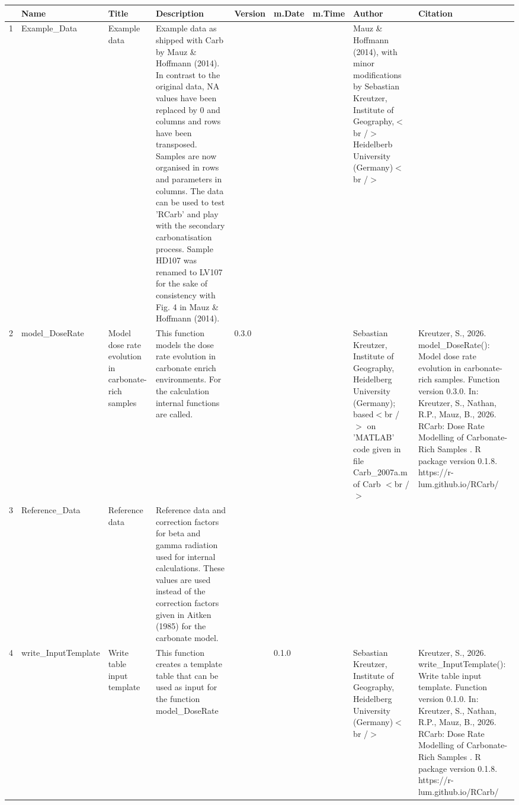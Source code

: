 \begin{table}[ht]
\centering
\begin{tabular}{rllllllll}
  \hline
 & Name & Title & Description & Version & m.Date & m.Time & Author & Citation \\ 
  \hline
1 & Example\_Data & Example data & Example data as shipped with  Carb  by Mauz \& Hoffmann (2014). In contrast to the original data,  NA  values have been replaced by 0 and columns and rows have been transposed. Samples are now organised in rows and parameters in columns.  The data can be used to test  'RCarb'  and play with the secondary carbonatisation process. Sample HD107 was renamed to LV107 for the sake of consistency with Fig. 4 in Mauz \& Hoffmann (2014). &  &  &  & Mauz \& Hoffmann (2014), with minor modifications by Sebastian Kreutzer, Institute of Geography,$<$br /$>$ Heidelberb University (Germany)$<$br /$>$ &  \\ 
  2 & model\_DoseRate & Model dose rate evolution in carbonate-rich samples & This function models the dose rate evolution in carbonate enrich environments. For the calculation internal functions are called. & 0.3.0
 &  &  & Sebastian Kreutzer, Institute of Geography, Heidelberg University (Germany); based$<$br /$>$ on 'MATLAB' code given in file Carb\_2007a.m of  Carb $<$br /$>$ & Kreutzer, S., 2026. model\_DoseRate(): Model dose rate evolution in carbonate-rich samples. Function version 0.3.0. In: Kreutzer, S., Nathan, R.P., Mauz, B., 2026. RCarb: Dose Rate Modelling of Carbonate-Rich Samples . R package version 0.1.8. https://r-lum.github.io/RCarb/
 \\ 
  3 & Reference\_Data & Reference data & Reference data and correction factors for beta and gamma radiation used for internal calculations. These values are used instead of the correction factors given in Aitken (1985) for the carbonate model. &  &  &  &  &  \\ 
  4 & write\_InputTemplate & Write table input template & This function creates a template table that can be used as input for the function model\_DoseRate &  & 0.1.0
 &  & Sebastian Kreutzer, Institute of Geography, Heidelberg University (Germany)$<$br /$>$ & Kreutzer, S., 2026. write\_InputTemplate(): Write table input template. Function version 0.1.0. In: Kreutzer, S., Nathan, R.P., Mauz, B., 2026. RCarb: Dose Rate Modelling of Carbonate-Rich Samples . R package version 0.1.8. https://r-lum.github.io/RCarb/
 \\ 
   \hline
\end{tabular}
\end{table}

